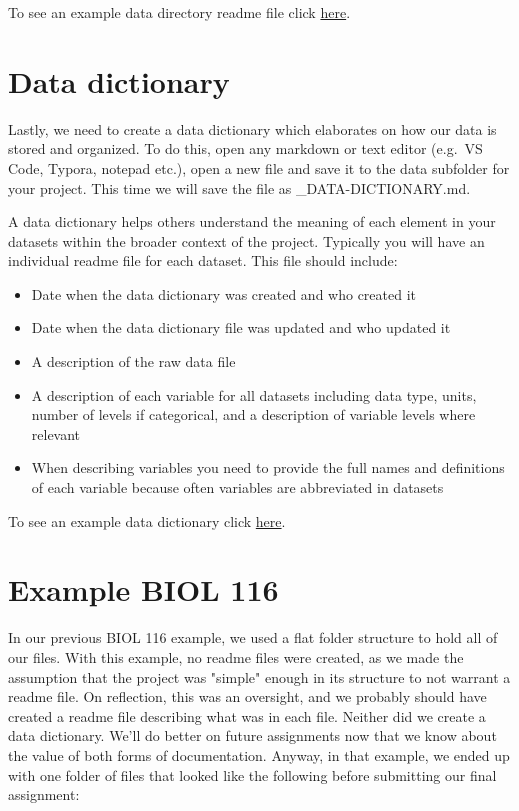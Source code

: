 \documentclass[
]{book}
\providecommand{\tightlist}{%
  \setlength{\itemsep}{0pt}\setlength{\parskip}{0pt}}
\begin{document}
To see an example data directory readme file click \href{files/DS_dataREADME.md}{here}.

\section{Data dictionary}\label{data-dictionary}

Lastly, we need to create a data dictionary which elaborates on how our data is stored and organized. To do this, open any markdown or text editor (e.g.~VS Code, Typora, notepad etc.), open a new file and save it to the data subfolder for your project. This time we will save the file as \_DATA-DICTIONARY.md.

A data dictionary helps others understand the meaning of each element in your datasets within the broader context of the project. Typically you will have an individual readme file for each dataset. This file should include:

\begin{itemize}
\tightlist
\item
  Date when the data dictionary was created and who created it
\item
  Date when the data dictionary file was updated and who updated it
\item
  A description of the raw data file
\item
  A description of each variable for all datasets including data type, units, number of levels if categorical, and a description of variable levels where relevant
\item
  When describing variables you need to provide the full names and definitions of each variable because often variables are abbreviated in datasets
\end{itemize}

To see an example data dictionary click \href{files/DS_DATA-DICTIONARY.md}{here}.

\section{Example BIOL 116}\label{example-biol-116}

In our previous BIOL 116 example, we used a flat folder structure to hold all of our files. With this example, no readme files were created, as we made the assumption that the project was "simple" enough in its structure to not warrant a readme file. On reflection, this was an oversight, and we probably should have created a readme file describing what was in each file. Neither did we create a data dictionary. We'll do better on future assignments now that we know about the value of both forms of documentation. Anyway, in that example, we ended up with one folder of files that looked like the following before submitting our final assignment:
\end{document}
